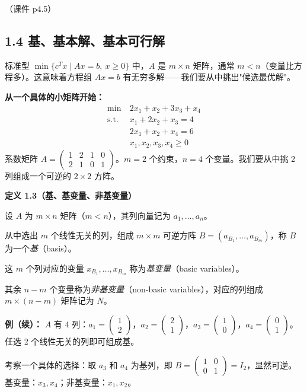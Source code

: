 （课件 p4.5）

\subsection{1.4 基、基本解、基本可行解}

标准型 $\min\{c^Tx\mid Ax=b,\ x\ge 0\}$ 中，$A$ 是 $m\times n$ 矩阵，通常 $m<n$（变量比方程多）。这意味着方程组 $Ax=b$ 有无穷多解——我们要从中挑出"候选最优解"。

\textbf{从一个具体的小矩阵开始：}
\[
\begin{aligned}
\min\ & 2x_1 + x_2 + 3x_3 + x_4 \\
\text{s.t.}\ & x_1 + 2x_2 + x_3 = 4 \\
& 2x_1 + x_2 + x_4 = 6 \\
& x_1,x_2,x_3,x_4 \ge 0
\end{aligned}
\]
系数矩阵 $A = \begin{pmatrix}1 & 2 & 1 & 0 \\ 2 & 1 & 0 & 1\end{pmatrix}$。$m=2$ 个约束，$n=4$ 个变量。我们要从中挑 2 列组成一个可逆的 $2\times 2$ 方阵。

\textbf{定义 1.3（基、基变量、非基变量）}

设 $A$ 为 $m\times n$ 矩阵（$m<n$），其列向量记为 $a_1,\dots,a_n$。

从中选出 $m$ 个线性无关的列，组成 $m\times m$ 可逆方阵 $B=(a_{B_1},\dots,a_{B_m})$，称 $B$ 为一个\emph{基}（basis）。

这 $m$ 个列对应的变量 $x_{B_1},\dots,x_{B_m}$ 称为\emph{基变量}（basic variables）。

其余 $n-m$ 个变量称为\emph{非基变量}（non-basic variables），对应的列组成 $m\times(n-m)$ 矩阵记为 $N$。

\textbf{例（续）：} $A$ 有 4 列：$a_1=\begin{pmatrix}1\\2\end{pmatrix}$，$a_2=\begin{pmatrix}2\\1\end{pmatrix}$，$a_3=\begin{pmatrix}1\\0\end{pmatrix}$，$a_4=\begin{pmatrix}0\\1\end{pmatrix}$。任选 2 个线性无关的列即可组成基。

考察一个具体的选择：取 $a_3$ 和 $a_4$ 为基列，即 $B = \begin{pmatrix}1&0\\0&1\end{pmatrix}=I_2$，显然可逆。基变量：$x_3,x_4$；非基变量：$x_1,x_2$。

